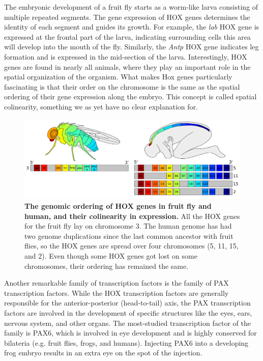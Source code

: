 The embryonic development of a fruit fly starts as a worm-like larva consisting of multiple repeated segments. The gene expression of HOX genes determines the identity of each segment and guides its growth. For example, the \textit{lab} HOX gene is expressed at the frontal part of the larva, indicating surrounding cells this area will develop into the mouth of the fly\cite{Hughes2002}. Similarly, the \textit{Antp} HOX gene indicates leg formation and is expressed in the mid-section of the larva. Interestingly, HOX genes are found in nearly all animals, where they play an important role in the spatial organization of the organism. What makes Hox genes particularly fascinating is that their order on the chromosome is the same as the spatial ordering of their gene expression along the embryo. This concept is called spatial colinearity, something we as yet have no clear explanation for\cite{Gaunt2015}.

\begin{figure}
    \center
    \includegraphics[width=\linewidth]{ch.introduction/imgs/hox.png}
    \caption{\textbf{The genomic ordering of HOX genes in fruit fly and human, and their colinearity in expression.} All the HOX genes for the fruit fly lay on chromosome 3. The human genome has had two genome duplications since the last common ancestor with fruit flies, so the HOX genes are spread over four chromosomes (5, 11, 15, and 2). Even though some HOX genes got lost on some chromosomes, their ordering has remained the same.}
    \label{fig:hox}
\end{figure}

Another remarkable family of transcription factors is the family of PAX transcription factors. While the HOX transcription factors are generally responsible for the anterior-posterior (head-to-tail) axis, the PAX transcription factors are involved in the development of specific structures like the eyes, ears, nervous system, and other organs. The most-studied transcription factor of the family is PAX6, which is involved in eye development and is highly conserved for bilateria (e.g. fruit flies, frogs, and humans). Injecting PAX6 into a developing frog embryo results in an extra eye on the spot of the injection\cite{Chow1999}.

